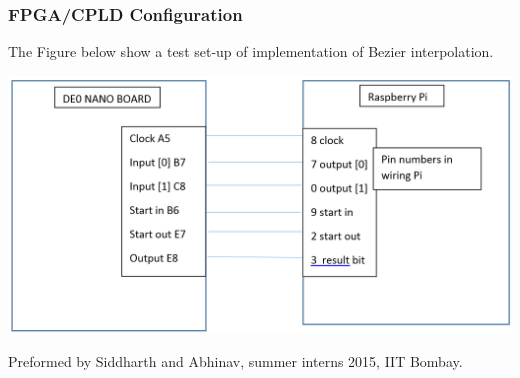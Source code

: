 \begin{frame}
\frametitle{FPGA/CPLD Configuration}   %
The Figure below show a test set-up of implementation of Bezier interpolation.
   \begin{center}
   \includegraphics[scale=0.2]{./figs/DeNano_rPi}
   \end{center}
\tiny
Preformed by Siddharth and Abhinav, summer interns 2015, IIT Bombay.
\end{frame}